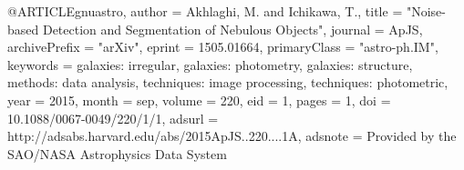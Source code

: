 
@ARTICLE{gnuastro,
   author = {{Akhlaghi}, M. and {Ichikawa}, T.},
    title = "{Noise-based Detection and Segmentation of Nebulous Objects}",
  journal = {ApJS},
archivePrefix = "arXiv",
   eprint = {1505.01664},
 primaryClass = "astro-ph.IM",
 keywords = {galaxies: irregular, galaxies: photometry, galaxies: structure, methods: data analysis, techniques: image processing, techniques: photometric},
     year = 2015,
    month = sep,
   volume = 220,
      eid = {1},
    pages = {1},
      doi = {10.1088/0067-0049/220/1/1},
   adsurl = {http://adsabs.harvard.edu/abs/2015ApJS..220....1A},
  adsnote = {Provided by the SAO/NASA Astrophysics Data System}
}